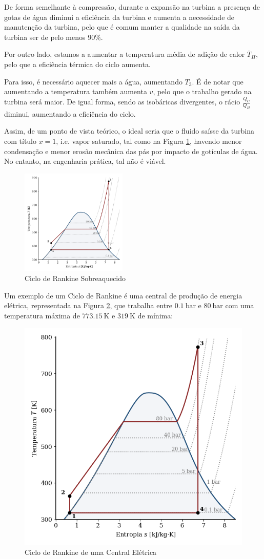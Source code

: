 De forma semelhante à compressão, durante a expansão na turbina a presença de gotas de água diminui a eficiência da turbina e aumenta a necessidade de manutenção da turbina, pelo que é comum manter a qualidade na saída da turbina ser de pelo menos $90 \%$.

Por outro lado, estamos a aumentar a temperatura média de adição de calor $\bar{T}_H$, pelo que a eficiência térmica do ciclo aumenta.

Para isso, é necessário aquecer mais a água, aumentando $T_3$. É de notar que aumentando a temperatura também aumenta $v$, pelo que o trabalho gerado na turbina será maior. De igual forma, sendo as isobáricas divergentes, o rácio $\frac{Q_C}{Q_H}$ diminui, aumentando a eficiência do ciclo.

Assim, de um ponto de vista teórico, o ideal seria que o fluido saísse da turbina com título $x=1$, i.e. vapor saturado, tal como na Figura \ref{fig:rankine-Ts-ideal-sobreaquecido}, havendo menor condensação e menor erosão mecânica das pás por impacto de gotículas de água. No entanto, na engenharia prática, tal não é viável.

\begin{figure}[H]
    \centering
    \includegraphics[width=0.45\textwidth]{graphs/rankine-Ts-ideal-sobreaquecido.png}
    \caption{Ciclo de Rankine Sobreaquecido}
    \label{fig:rankine-Ts-ideal-sobreaquecido}
\end{figure}

Um exemplo de um Ciclo de Rankine é uma central de produção de energia elétrica, representada na Figura \ref{fig:rankine-Ts-ideal-powerplant}, que trabalha entre $0.1~\text{bar}$ e $80~\text{bar}$ com uma temperatura máxima de $773.15~\text{K}$ e $319~\text{K}$ de mínima: 

\begin{figure}[H]
    \centering
    \includegraphics[width=0.45\linewidth]{graphs/rankine-Ts-ideal-powerplant.png}
    \caption{Ciclo de Rankine de uma Central Elétrica}
    \label{fig:rankine-Ts-ideal-powerplant}
\end{figure}

